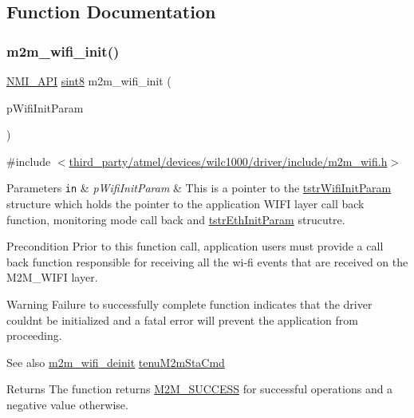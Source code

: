 \subsection{Function Documentation}
\mbox{\label{group__WifiInitFn_ga73c734812e844d96d860c4e93e9daf35}} 
\subsubsection{\texorpdfstring{m2m\+\_\+wifi\+\_\+init()}{m2m\_wifi\_init()}}
{\footnotesize\ttfamily \hyperlink{group__BSPDefine_gaecc0323d771e41ef81a76b5f12783e22}{N\+M\+I\+\_\+\+A\+PI} \hyperlink{group__DataT_gae35f10ffd0ac8dd2bc3e794da9bdfbc7}{sint8} m2m\+\_\+wifi\+\_\+init (\begin{DoxyParamCaption}\item[{\hyperlink{structtstrWifiInitParam}{tstr\+Wifi\+Init\+Param} $\ast$}]{p\+Wifi\+Init\+Param }\end{DoxyParamCaption})}



{\ttfamily \#include $<$\hyperlink{m2m__wifi_8h}{third\+\_\+party/atmel/devices/wilc1000/driver/include/m2m\+\_\+wifi.\+h}$>$}


\begin{DoxyParams}[1]{Parameters}
\mbox{\tt in}  & {\em p\+Wifi\+Init\+Param} & This is a pointer to the \hyperlink{structtstrWifiInitParam}{tstr\+Wifi\+Init\+Param} structure which holds the pointer to the application W\+I\+FI layer call back function, monitoring mode call back and \hyperlink{structtstrEthInitParam}{tstr\+Eth\+Init\+Param} strucutre.\\
\hline
\end{DoxyParams}
\begin{DoxyPrecond}{Precondition}
Prior to this function call, application users must provide a call back function responsible for receiving all the wi-\/fi events that are received on the M2\+M\+\_\+\+W\+I\+FI layer.
\end{DoxyPrecond}
\begin{DoxyWarning}{Warning}
Failure to successfully complete function indicates that the driver couldn\textquotesingle{}t be initialized and a fatal error will prevent the application from proceeding.
\end{DoxyWarning}
\begin{DoxySeeAlso}{See also}
\hyperlink{group__WifiDeinitFn_gacadee10a536f3e9817f26aa52b0bb954}{m2m\+\_\+wifi\+\_\+deinit} \hyperlink{group__WlanEnums_ga064de09dec1d5e88ed8d075fa40f57de}{tenu\+M2m\+Sta\+Cmd}
\end{DoxySeeAlso}
\begin{DoxyReturn}{Returns}
The function returns \hyperlink{nm__common_8h_a9ef27ba27aafdd1aa3a79d3ba2c36b8f}{M2\+M\+\_\+\+S\+U\+C\+C\+E\+SS} for successful operations and a negative value otherwise. 
\end{DoxyReturn}


